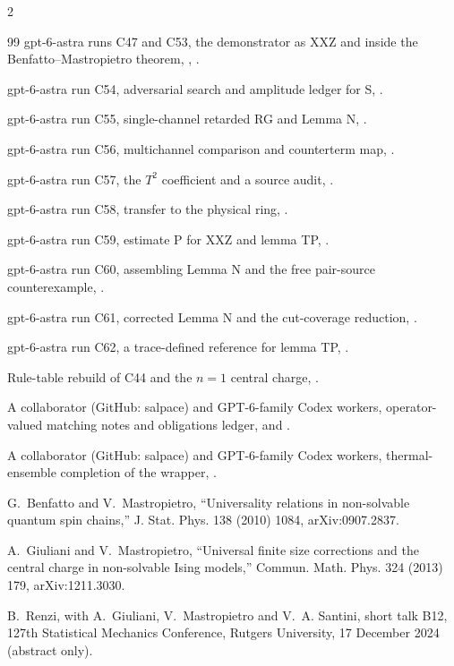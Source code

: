 \documentclass[11pt]{article}
\theoremstyle{definition}
\begin{document}
\begin{multicols}{2}
\begin{thebibliography}{99}
 gpt-6-astra runs C47 and C53, the demonstrator as XXZ and inside the Benfatto--Mastropietro theorem, , .

 gpt-6-astra run C54, adversarial search and amplitude ledger for S, .

 gpt-6-astra run C55, single-channel retarded RG and Lemma N, .

 gpt-6-astra run C56, multichannel comparison and counterterm map, .

 gpt-6-astra run C57, the $T^2$ coefficient and a source audit, .

 gpt-6-astra run C58, transfer to the physical ring, .

 gpt-6-astra run C59, estimate P for XXZ and lemma TP, .

 gpt-6-astra run C60, assembling Lemma N and the free pair-source counterexample, .

 gpt-6-astra run C61, corrected Lemma N and the cut-coverage reduction, .

 gpt-6-astra run C62, a trace-defined reference for lemma TP, .

 Rule-table rebuild of C44 and the $n=1$ central charge, .

 A collaborator (GitHub: salpace) and GPT-6-family Codex workers, operator-valued matching notes and obligations ledger,  and .

 A collaborator (GitHub: salpace) and GPT-6-family Codex workers, thermal-ensemble completion of the wrapper, .

 G.~Benfatto and V.~Mastropietro, ``Universality relations in non-solvable quantum spin chains,'' J. Stat. Phys. 138 (2010) 1084, arXiv:0907.2837.

 A.~Giuliani and V.~Mastropietro, ``Universal finite size corrections and the central charge in non-solvable Ising models,'' Commun. Math. Phys. 324 (2013) 179, arXiv:1211.3030.

 B.~Renzi, with A.~Giuliani, V.~Mastropietro and V.~A. Santini, short talk B12, 127th Statistical Mechanics Conference, Rutgers University, 17 December 2024 (abstract only).


\end{thebibliography}
\end{multicols}
\end{document}
